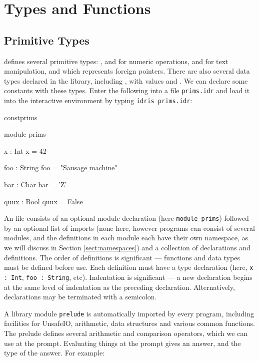 \section{Types and Functions}

\subsection{Primitive Types}

\Idris{} defines several primitive types: ,  and
 for numeric operations,  and  for
text manipulation, and  which represents foreign pointers.
There are also several data types declared in the library, including
, with values  and .
We can declare some constants with these types. Enter the following
into a file \texttt{prims.idr} and load it into the \Idris{} interactive
environment by typing \texttt{idris prims.idr}:

\begin{SaveVerbatim}{constprims}

module prims

x : Int
x = 42

foo : String
foo = "Sausage machine"

bar : Char
bar = 'Z'

quux : Bool
quux = False

\end{SaveVerbatim}

\noindent
An \Idris{} file consists of an optional module declaration (here
\texttt{module prims}) followed by an optional list of imports (none here,
however \Idris{} programs can consist of several modules, and the definitions
in each module each have their own namespace, as we will discuss in Section
\ref{sect:namespaces}) and a
collection of declarations and definitions. The order of definitions is
significant --- functions and data types must be defined before use.
Each definition must have a type
declaration (here, \texttt{x : Int}, \texttt{foo : String}, etc).
Indentation is significant --- a new declaration begins at the same level
of indentation as the preceding declaration. Alternatively, declarations
may be terminated with a semicolon.

A library module \texttt{prelude} is automatically imported by every \Idris{} program,
including facilities for UnsafeIO, arithmetic, data structures and various common
functions. The prelude defines several arithmetic and comparison operators,
which we can use at the prompt. Evaluating things at the prompt gives an
answer, and the type of the answer. For example:

